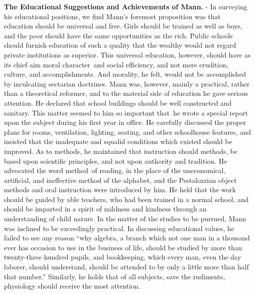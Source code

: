 \documentclass[
]{book}
\begin{document}
\textbf{The Educational Suggestions and Achievements of Mann.} - In surveying his educational positions, we find Mann's foremost proposition was that education should be universal and free. Girls should be trained as well as boys, and the poor should have the same opportunities as the rich. Public schools should furnish education of such a quality that the wealthy would not regard private institutions as superior. This universal education, however, should have as its chief aim moral character~and social efficiency, and not mere erudition, culture, and accomplishments. And morality, he felt, would not be accomplished by inculcating sectarian doctrines. Mann was, however, mainly a practical, rather than a theoretical reformer, and to the material side of education he gave serious attention. He declared that school buildings should be well constructed and sanitary. This matter seemed to him so important that~he wrote a special report upon the subject during his first year in office. He carefully discussed the proper plans for rooms, ventilation, lighting, seating, and other schoolhouse features, and insisted that the inadequate and squalid conditions which existed should be improved. As to methods, he maintained that instruction should methods, be based upon scientific principles, and not upon authority and tradition. He advocated the word method~of reading, in the place of the uneconomical, artificial, and ineffective method of the alphabet, and the Pestalozzian object methods and oral instruction were introduced by him. He held that the work should be guided by able teachers, who had been trained in a normal school, and should be imparted in a spirit of mildness and kindness through an understanding of child nature. In the matter of the studies to be pursued, Mann was inclined to be exceedingly practical. In discussing educational values, he failed to see any reason ``why algebra, a branch which not one man in a thousand ever has occasion to use in the business of life, should be studied by more than twenty-three hundred pupils, and bookkeeping, which every man, even the day laborer, should understand, should be attended to by only a little more than half that number.'' Similarly, he holds that of all subjects, save the rudiments, physiology should receive the most attention.
\end{document}
